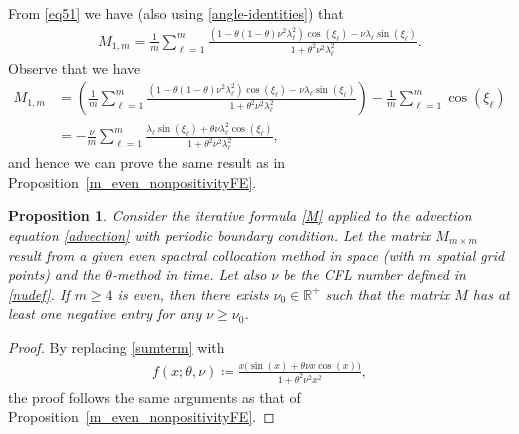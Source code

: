 \documentclass[a4paper]{article}
\newtheorem{proposition}{Proposition}
\newcommand{\rr}{\mathbb{R}}
\begin{document}
\begin{description}[style=unboxed,leftmargin=0cm]
\item [{Case 1:} $m$ is {even}.]
From \eqref{eq51} we have (also using \eqref{angle-identities}) that
\begin{align*}
  M_{1,m} = \frac{1}{m} \sum_{\ell=1}^{m} \frac{\left(1-\theta(1-\theta)\nu^2\lambda_\ell^2\right)
  \cos(\xi_\ell) - \nu\lambda_\ell\sin(\xi_\ell)}{1+\theta^2\nu^2\lambda_\ell^2}.
\end{align*}
Observe that we have
\begin{align*}
	M_{1,m} & = \left(\frac{1}{m} \sum_{\ell=1}^{m} \frac{\left(1-\theta(1-\theta)\nu^2\lambda_\ell^2\right)
	\cos(\xi_\ell) - \nu\lambda_\ell\sin(\xi_\ell)}{1+\theta^2\nu^2\lambda_\ell^2}\right) -
	\frac{1}{m}\sum_{\ell=1}^m \cos(\xi_\ell) \\
	&= -\frac{\nu}{m} \sum_{\ell=1}^{m} \frac{\lambda_\ell\sin(\xi_\ell) + \theta\nu\lambda_\ell^2 \cos(\xi_\ell)}
	{1+\theta^2\nu^2\lambda_\ell^2},  %
\end{align*}
and hence we can prove the same result as in Proposition~\ref{m_even_nonpositivityFE}.
\begin{proposition}\label{m_even_nonpositivitySpectral}
	Consider the iterative formula \eqref{M} applied to the advection equation \eqref{advection} with periodic
	boundary condition.
	Let the matrix $M_{m \times m}$ result from a given even spactral collocation method in space (with $m$
	spatial grid points) and the $\theta$-method in time.
	Let also $\nu$ be the CFL number defined in \eqref{nudef}.
	If $m \ge 4$ is even, then there exists $\nu_0  \in \rr^+$ such that the matrix $M$ has at least one
	negative entry for any $\nu \ge \nu_0$.
\end{proposition}
\begin{proof}
	By replacing \eqref{sumterm} with
	\begin{align*}
		f(x; \theta, \nu) \coloneqq \frac{x\bigl(\sin(x)+\theta\nu x\cos(x)\bigr)}{1+\theta^2\nu^2x^2},
	\end{align*}
	the proof follows the same arguments as that of Proposition~\ref{m_even_nonpositivityFE}.
\end{proof}


\end{description}
\end{document}
